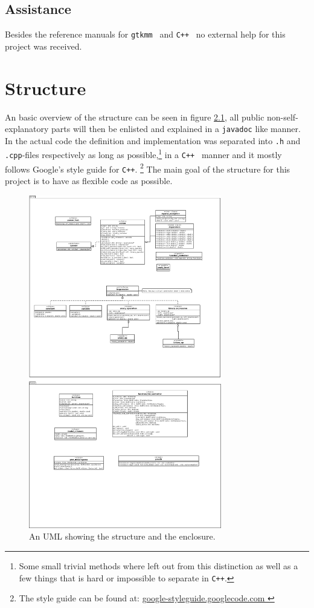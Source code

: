 \documentclass[a4paper,11pt]{kth-mag}
\newcommand{\Cpp}{\texttt{C++}}
\newcommand{\Gtkmm}{\texttt{gtkmm}}
\begin{document}
\section{Assistance}
Besides the reference manuals for \Gtkmm~ and \Cpp~ no external help for 
this project was received.

\chapter{Structure}
An basic overview of the structure can be seen in figure \ref{fig:UML}, all
public non-self-explanatory parts will then be enlisted and explained in 
a \verb+javadoc+ like manner. In the actual code the definition and
implementation was separated into \texttt{.h} and \texttt{.cpp}-files
respectively as long as possible,\footnote{Some small trivial methods where
left out from this distinction as well as a few things that is hard or
impossible to separate in \Cpp.} in a \Cpp~ manner and it mostly follows Google's
style guide for \Cpp.
\footnote{The style guide can be found at:
\href{
    http://google-styleguide.googlecode.com/svn/trunk/cppguide.xml
    }{
    google-styleguide.googlecode.com
    }
} 
The main goal of the structure for this project is to have as flexible code as possible.
\begin{figure}[ht]
\begin{center}
    \includegraphics[width=0.75\textwidth]{uml.pdf}
    \caption{\small{An UML showing the structure and the enclosure.}}\label{fig:UML}
\end{center}
\end{figure}
\end{document}
